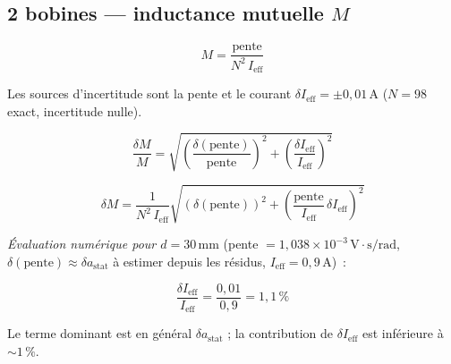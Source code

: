 \documentclass[a4paper,10pt]{article}
\begin{document}
\subsection{2 bobines --- inductance mutuelle \texorpdfstring{$M$}{M}}

\begin{equation}
  M = \frac{\text{pente}}{N^2\,I_\text{eff}}
\end{equation}

Les sources d'incertitude sont la pente et le courant
$\delta I_\text{eff} = \pm 0{,}01\,\text{A}$ ($N = 98$ exact, incertitude nulle).

\begin{equation}
  \frac{\delta M}{M}
  = \sqrt{\left(\frac{\delta(\text{pente})}{\text{pente}}\right)^2
          + \left(\frac{\delta I_\text{eff}}{I_\text{eff}}\right)^2}
\end{equation}

\begin{equation}
  \boxed{
  \delta M
  = \frac{1}{N^2\,I_\text{eff}}
    \sqrt{\left(\delta(\text{pente})\right)^2
          + \left(\frac{\text{pente}}{I_\text{eff}}\,\delta I_\text{eff}\right)^2}
  }
\end{equation}

\textit{Évaluation numérique pour $d = 30\,\text{mm}$}
(pente $= 1{,}038 \times 10^{-3}\,\text{V}{\cdot}\text{s/rad}$,
$\delta(\text{pente}) \approx \delta a_\text{stat}$ à estimer depuis les résidus,
$I_\text{eff} = 0{,}9\,\text{A}$)~:

\begin{equation}
  \frac{\delta I_\text{eff}}{I_\text{eff}} = \frac{0{,}01}{0{,}9} = 1{,}1\,\%
\end{equation}

Le terme dominant est en général $\delta a_\text{stat}$ ;
la contribution de $\delta I_\text{eff}$ est inférieure à $\sim 1\,\%$.
\end{document}

